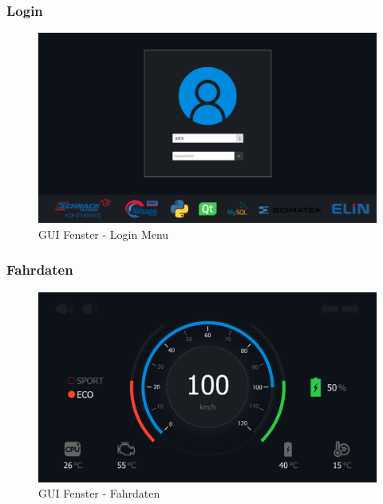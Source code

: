 \subsubsection{Login}

\begin{figure}[H]
	\begin{center}
		\includegraphics[scale=0.24]{figures/hcis/window_login.png}
			\caption{GUI Fenster - Login Menu}
			\label{fig:pageMenu}
	\end{center}
\end{figure}

\subsubsection{Fahrdaten}

\begin{figure}[H]
	\begin{center}
		\includegraphics[scale=0.24]{figures/hcis/window_dashboard.png}
			\caption{GUI Fenster - Fahrdaten}
			\label{fig:pageDash}
	\end{center}
\end{figure}

